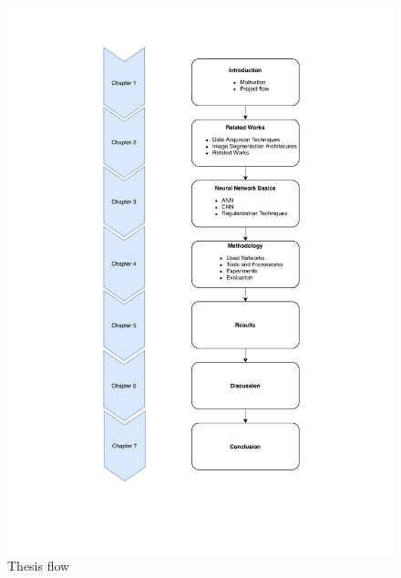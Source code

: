 \begin{figure}
    \centerline{\includegraphics[width=1\columnwidth]{01-introduction/figures/project-flow.pdf}}
    \caption{ Thesis flow }
    \label{figure:project-flow}
\end{figure}